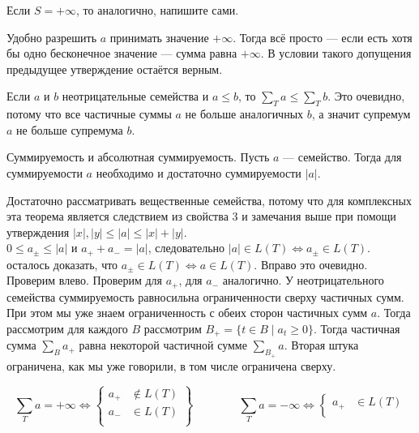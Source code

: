 \documentclass{article}
\begin{document}
\begin{itemize}
\begin{Proof}
            Если $S=+\infty$, то аналогично, напишите сами.
        \end{Proof}
        \begin{Comment}
            Удобно разрешить $a$ принимать значение $+\infty$. Тогда всё просто --- если есть хотя бы одно бесконечное значение --- сумма равна $+\infty$. В условии такого допущения предыдущее утверждение остаётся верным.
        \end{Comment}
        \begin{Comment}
            Если $a$ и $b$ неотрицательные семейства и $a\leqslant b$, то $\sum\limits_Ta\leqslant\sum\limits_Tb$. Это очевидно, потому что все частичные суммы $a$ не больше аналогичных $b$, а значит супремум $a$ не больше супремума $b$.
        \end{Comment}
        \thm Суммируемость и абсолютная суммируемость. Пусть $a$ --- семейство. Тогда для суммируемости $a$ необходимо и достаточно суммируемости $|a|$.
        \begin{Proof}
            Достаточно рассматривать вещественные семейства, потому что для комплексных эта теорема является следствием из свойства 3 и замечания выше при помощи утверждения $|x|,|y|\leqslant|a|\leqslant|x|+|y|$.\\
            $0\leqslant a_\pm\leqslant |a|$ и $a_++a_-=|a|$, следовательно $|a|\in L(T)\Leftrightarrow a_\pm\in L(T)$. осталось доказать, что $a_\pm\in L(T)\Leftrightarrow a\in L(T)$. Вправо это очевидно. Проверим влево. Проверим для $a_+$, для $a_-$ аналогично. У неотрицательного семейства суммируемость равносильна ограниченности сверху частичных сумм. При этом мы уже знаем ограниченность с обеих сторон частичных сумм $a$. Тогда рассмотрим для каждого $B$ рассмотрим $B_+=\{t\in B\mid a_t\geqslant0\}$. Тогда частичная сумма $\sum\limits_{B}a_+$ равна некоторой частичной сумме $\sum\limits_{B_+}a$. Вторая штука ограничена, как мы уже говорили, в том числе ограничена сверху.
        \end{Proof}
        \begin{Comment}
            $$\sum\limits_T a=+\infty\Leftrightarrow\left\{\begin{aligned}
                a_+&\notin L(T)\\
                a_-&\in L(T)\\
            \end{aligned}\right\}\qquad\qquad
            \sum\limits_T a=-\infty\Leftrightarrow\left\{\begin{aligned}
                a_+&\in L(T)\\

\end{aligned}$$
\end{Comment}
\end{itemize}
\end{document}
